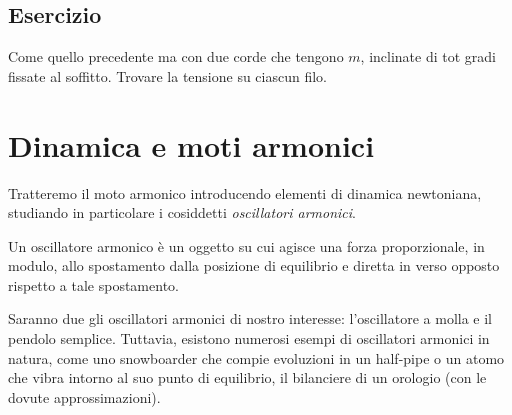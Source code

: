 \subsection*{Esercizio}
Come quello precedente ma con due corde che tengono $m$, inclinate di
tot gradi fissate al soffitto. Trovare la tensione su ciascun filo.




\section{Dinamica e moti armonici}
Tratteremo il moto armonico introducendo elementi di dinamica newtoniana,
studiando in particolare i cosiddetti \textit{oscillatori armonici}.
\vspace{8pt}
\begin{tcolorbox}[colback = yellow!30, colframe = yellow!30!black, title = {Oscillatore armonico}]
    Un oscillatore armonico è un oggetto su cui agisce una forza proporzionale,
    in modulo, allo spostamento dalla posizione di equilibrio e diretta in
    verso opposto rispetto a tale spostamento.
\end{tcolorbox}
\vspace{5pt}
Saranno due gli oscillatori armonici di nostro interesse: l'oscillatore a
molla e il pendolo semplice. Tuttavia, esistono numerosi esempi di oscillatori
armonici in natura, come uno snowboarder che compie evoluzioni in un half-pipe o
un atomo che vibra intorno al suo punto di equilibrio, il bilanciere di un
orologio (con le dovute approssimazioni).



